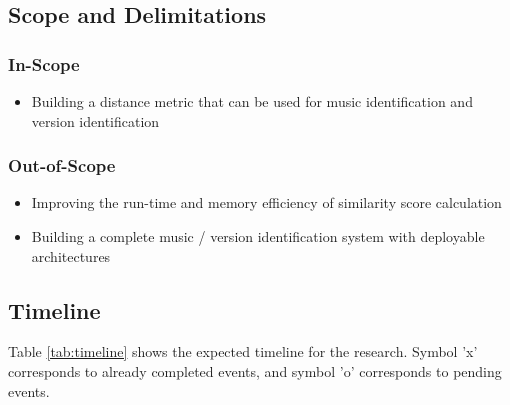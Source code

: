 \documentclass[../main.tex]{subfiles}
\begin{document}
\subsection{Scope and Delimitations}

\subsubsection{In-Scope}
\begin{itemize}
    \item Building a distance metric that can be used for music identification and version identification
\end{itemize}

\subsubsection{Out-of-Scope}
\begin{itemize}
    \item Improving the run-time and memory efficiency of similarity score calculation
    \item Building a complete music / version identification system with deployable architectures
\end{itemize}


\newpage
\subsection{Timeline}

Table \ref{tab:timeline} shows the expected timeline for the research. Symbol 'x' corresponds to already completed events, and symbol 'o' corresponds to pending events.

\begin{table}[H]
    \centering
    \caption{Expected Timeline}
    \label{tab:timeline}
\end{table}
\end{document}
